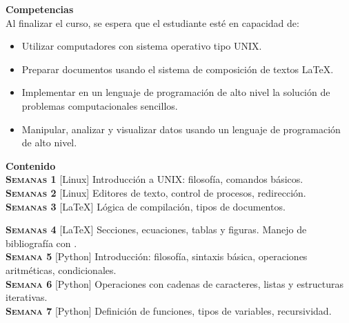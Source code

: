 \documentclass[letterpaper,10pt,onecolumn]{article}
\begin{document}
\noindent\textbf{\large {} \quad Competencias}\\[-0.2cm]

\noindent\normalsize Al finalizar el curso, se espera que el estudiante esté en capacidad de:

\begin{itemize}
	\item Utilizar computadores con sistema operativo tipo UNIX.\\[-0.6cm]
	\item Preparar documentos usando el sistema de composición de textos \LaTeX.\\[-0.6cm]
	\item Implementar en un lenguaje de programación de alto nivel la solución de problemas computacionales sencillos.\\[-0.6cm]
	\item Manipular, analizar y visualizar datos usando un lenguaje de programación de alto nivel.\\[-0.2cm]
\end{itemize}

\noindent\textbf{\large {} \quad Contenido}\\[-0.2cm]

\noindent\normalsize \textbf{\textsc{Semanas 1}} [Linux]
Introducción a UNIX: filosofía, comandos básicos.
\\[-0.3cm] 

\noindent\textbf{\textsc{Semanas 2}}  [Linux] Editores de texto,
control de procesos, redirección. \\[-0.3cm]  

\noindent\textbf{\textsc{Semanas 3}} [\LaTeX] Lógica de
compilación, tipos de documentos.

\noindent\textbf{\textsc{Semanas 4}} [\LaTeX] Secciones, ecuaciones, tablas y
figuras. Manejo de bibliografía con \BibTeX.\\[-0.3cm]   

\noindent\textbf{\textsc{Semana 5}} [Python] Introducción: filosofía,
sintaxis básica, operaciones aritméticas, condicionales.\\[-0.3cm]   

\noindent\textbf{\textsc{Semana 6}} [Python] Operaciones con cadenas de
caracteres, listas y estructuras iterativas.\\[-0.3cm] 

\noindent\textbf{\textsc{Semana 7}} [Python] Definición de funciones,
tipos de variables, recursividad. \\[-0.3cm] 
\end{document}
